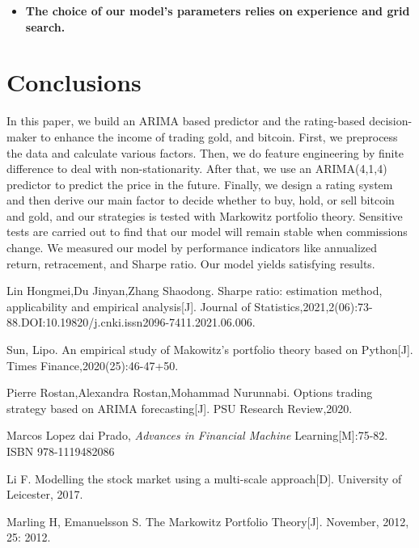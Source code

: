 \documentclass[12pt,a4paper]{article}
\newcommand{\Predictor}{ARIMA }
\begin{document}
\begin{spacing}{1.2}
\begin{itemize}
\item \textbf{The choice of our model's parameters relies on experience and grid search.}
\end{itemize}


\section{Conclusions}
\label{Conclusions}

In this paper, we build an \Predictor based predictor and the rating-based decision-maker to enhance the income of trading gold, and bitcoin. First, we preprocess the data and calculate various factors. Then, we do feature engineering by finite difference to deal with non-stationarity. After that, we use an ARIMA(4,1,4) predictor to predict the price in the future. Finally, we design a rating system and then derive our main factor to decide whether to buy, hold, or sell bitcoin and gold, and our strategies is tested with Markowitz portfolio theory. Sensitive tests are carried out to find that our model will remain stable when commissions change. We measured our model by performance indicators like annualized return, retracement, and Sharpe ratio. Our model yields satisfying results.




\newpage
\begin{thebibliography}{00}


Lin Hongmei,Du Jinyan,Zhang Shaodong. Sharpe ratio: estimation method, applicability and empirical analysis[J]. Journal of Statistics,2021,2(06):73-88.DOI:10.19820/j.cnki.issn2096-7411.2021.06.006.

Sun, Lipo. An empirical study of Makowitz's portfolio theory based on Python[J]. Times Finance,2020(25):46-47+50.

Pierre Rostan,Alexandra Rostan,Mohammad Nurunnabi. Options trading strategy based on ARIMA forecasting[J]. PSU Research Review,2020.


Marcos Lopez dai Prado, \textit{Advances in Financial Machine} Learning[M]:75-82. ISBN 978-1119482086

Li F. Modelling the stock market using a multi-scale approach[D]. University of Leicester, 2017.

Marling H, Emanuelsson S. The Markowitz Portfolio Theory[J]. November, 2012, 25: 2012.



\end{thebibliography}
\end{spacing}
\end{document}
